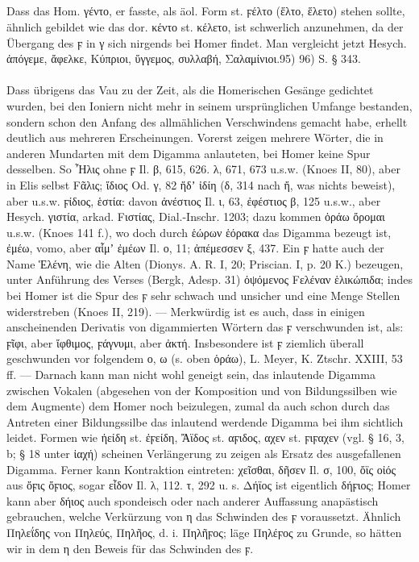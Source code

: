 {\small\noindent\subparagraph{} Dass das Hom. γέντο, er fasste, als äol. Form
  st. ϝέλτο (ἕλτο, ἕλετο) stehen sollte, ähnlich gebildet wie das dor. κέντο st.
  κέλετο, ist schwerlich anzunehmen, da der Übergang des ϝ in γ sich nirgends
  bei Homer findet. Man vergleicht jetzt Hesych. ἀπόγεμε, ἄφελκε, Κύπριοι,
ὕγγεμος, συλλαβή, Σαλαμίνιοι.95) 96) S. § 343. }

\paragraph{} Dass übrigens das Vau zu der Zeit, als die Homerischen Gesänge gedichtet wurden, bei den Ioniern nicht mehr in seinem ursprünglichen Umfange bestanden, sondern schon den Anfang des allmählichen Verschwindens gemacht habe, erhellt deutlich aus mehreren Erscheinungen. Vorerst zeigen mehrere Wörter, die in anderen Mundarten mit dem Digamma anlauteten, bei Homer keine Spur desselben. So Ἦλις ohne ϝ Il. β, 615, 626. λ, 671, 673 u.s.w. (Knoes II, 80), aber in Elis selbst Fᾶλις; ἴδιος Od. γ, 82 ἥδʼ ἰδίη (δ, 314 nach ἤ, was nichts beweist), aber  u.s.w. ϝίδιος, ἑστία: davon ἀνέστιος Il. ι, 63, ἐφέστιος β, 125 u.s.w., aber Hesych. γιστία, arkad. Fιστίας, Dial.-Inschr. 1203; dazu kommen ὁράω ὄρομαι u.s.w. (Knoes 141 f.), wo doch durch ἑώρων ἑόρακα das Digamma bezeugt ist, ἐμέω,  vomo, aber αἷμʼ ἐμέων Il. ο, 11; ἀπέμεσσεν ξ, 437. Ein ϝ hatte auch der Name Ἑλένη, wie die Alten (Dionys. A. R. I, 20; Priscian. I, p. 20 K.) bezeugen, unter Anführung des Verses (Bergk, Adesp. 31) ὀψόμενος Fελέναν ἑλικώπιδα; indes bei Homer ist die Spur des ϝ sehr schwach und unsicher und eine Menge Stellen widerstreben (Knoes II, 219). — Merkwürdig ist es auch, dass in einigen anscheinenden Derivatis von digammierten Wörtern das ϝ verschwunden ist, als: ϝῖφι, aber ἴφθιμος, ϝάγνυμι, aber ἀκτή. Insbesondere ist ϝ ziemlich überall geschwunden vor folgendem ο, ω (s. oben ὁράω), L. Meyer, K. Ztschr. XXIII, 53 ff. — Darnach kann man nicht wohl geneigt sein, das inlautende Digamma zwischen Vokalen (abgesehen von der Komposition und von Bildungssilben wie dem Augmente) dem Homer noch beizulegen, zumal da auch schon durch das Antreten einer Bildungssilbe das inlautend werdende Digamma bei ihm sichtlich leidet. Formen wie ἠείδη st. ἐϝείδη, Ἄϊδος st. αϝιδος, αχεν st. ϝιϝαχεν (vgl. § 16, 3, b; § 18 unter ἰαχή) scheinen Verlängerung zu zeigen als Ersatz des ausgefallenen Digamma. Ferner kann Kontraktion eintreten: χεῖσθαι, δῆσεν Il. σ, 100, ὄϊς οἰός aus ὄϝις ὄϝιος, sogar εἶδον Il. λ, 112. τ, 292 u. s. Δήϊος ist eigentlich δήϝιος; Homer kann aber δήιος auch spondeisch oder nach anderer Auffassung anapästisch gebrauchen, welche Verkürzung von η das Schwinden des ϝ voraussetzt. Ähnlich Πηλεΐδης von Πηλεύς, Πηλῆος, d. i. Πηλῆϝος; läge Πηλέϝος zu Grunde, so hätten wir in dem η den Beweis für das Schwinden des ϝ. 

